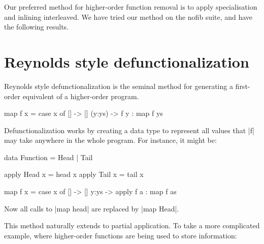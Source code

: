 \documentclass[preprint]{sigplanconf}
\begin{document}
Our preferred method for higher-order function removal is to apply specialisation and inlining interleaved. We have tried our method on the nofib suite, and have the following results.


\section{Reynolds style defunctionalization}

Reynolds style defunctionalization \cite{reynolds:defunc} is the seminal method for generating a first-order equivalent of a higher-order program.

\begin{example}
\begin{code}
map f x = case  x of
                []      -> []
                (y:ys)  -> f y : map f ys
\end{code}

\noindent Defunctionalization works by creating a data type to represent all values that |f| may take anywhere in the whole program. For instance, it might be:

\begin{code}
data Function = Head | Tail

apply Head  x = head  x
apply Tail  x = tail  x

map f x = case  x of
                []    -> []
                y:ys  -> apply f a : map f as
\end{code}

\noindent Now all calls to |map head| are replaced by |map Head|.
\end{example}

This method naturally extends to partial application. To take a more complicated example, where higher-order functions are being used to store information:
\end{document}
